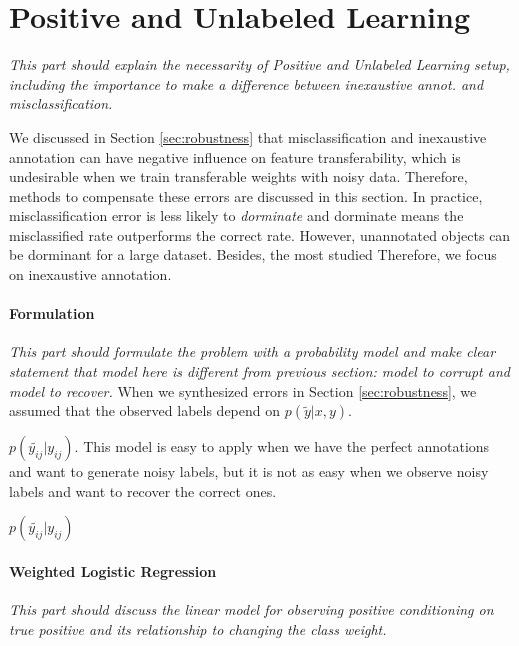 \section{Positive and Unlabeled Learning}
\label{sec:pulearning}

\noindent \textit{This part should explain the necessarity of Positive and Unlabeled Learning setup, including the importance to make a difference between inexaustive annot. and misclassification.}

\noindent
We discussed in Section \ref{sec:robustness} that misclassification and inexaustive annotation can have negative influence on feature transferability, which is undesirable when we train transferable weights with noisy data.
Therefore, methods to compensate these errors are discussed in this section.
In practice, misclassification error is less likely to \textit{dorminate} and dorminate means the misclassified rate outperforms the correct rate.
However, unannotated objects can be dorminant for a large dataset.
Besides,
the most studied \cite{reed2014training,sukhbaatar2014training,patrini2016making,jindal2016learning}
Therefore, we focus on inexaustive annotation.

\paragraph{Formulation}
\noindent \textit{This part should formulate the problem with a probability model and make clear statement that model here is different from previous section: model to corrupt and model to recover.}
\noindent
When we synthesized errors in Section \ref{sec:robustness}, we assumed that the observed labels depend on
$p(\tilde{y} \vert x, y)$.

$p(\tilde{y_{ij}} \vert y_{ij})$.
This model is easy to apply when we have the perfect annotations and want to generate noisy labels, but it is not as easy when we observe noisy labels and want to recover the correct ones.

$p(\tilde{y_{ij}} \vert y_{ij})$


\paragraph{Weighted Logistic Regression}
\noindent \textit{This part should discuss the linear model for observing positive conditioning on true positive and its relationship to changing the class weight.}


